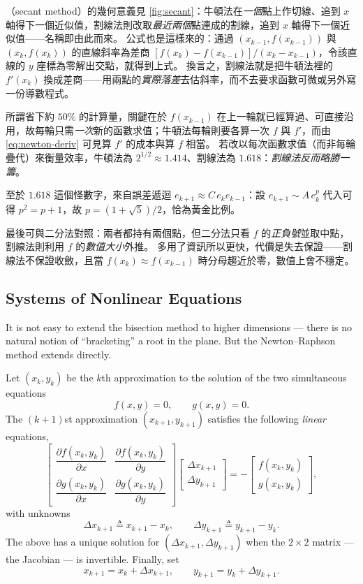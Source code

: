 \begin{remark}
	（secant method）的幾何意義見 \autoref{fig:secant}：牛頓法在\emph{一個}點上作切線、追到 $x$ 軸得下一個近似值，割線法則改取\emph{最近兩個}點連成的割線，追到 $x$ 軸得下一個近似值——名稱即由此而來。
	公式也是這樣來的：通過 $(x_{k-1}, f(x_{k-1}))$ 與 $(x_{k}, f(x_{k}))$ 的直線斜率為差商 $[f(x_{k})-f(x_{k-1})]/(x_{k}-x_{k-1})$，令該直線的 $y$ 座標為零解出交點，就得到上式。
	換言之，割線法就是把牛頓法裡的 $f'(x_{k})$ 換成差商——用兩點的\emph{實際落差}去估斜率，而不去要求函數可微或另外寫一份導數程式。

	所謂省下約 $50\%$ 的計算量，關鍵在於 $f(x_{k-1})$ 在上一輪就已經算過、可直接沿用，故每輪只需\emph{一次}新的函數求值；牛頓法每輪則要各算一次 $f$ 與 $f'$，而由 \eqref{eq:newton-deriv} 可見算 $f'$ 的成本與算 $f$ 相當。
	若改以每次函數求值（而非每輪疊代）來衡量效率，牛頓法為 $2^{1/2} \approx 1.414$、割線法為 $1.618$：\emph{割線法反而略勝一籌}。

	至於 $1.618$ 這個怪數字，來自誤差遞迴 $e_{k+1} \approx C\,e_{k}e_{k-1}$：設 $e_{k+1} \sim A\,e_{k}^{p}$ 代入可得 $p^{2} = p+1$，故 $p = (1+\sqrt{5})/2$，恰為黃金比例。

	最後可與二分法對照：兩者都持有兩個點，但二分法只看 $f$ 的\emph{正負號}並取中點，割線法則利用 $f$ 的\emph{數值大小}外推。
	多用了資訊所以更快，代價是失去保證——割線法不保證收斂，且當 $f(x_{k}) \approx f(x_{k-1})$ 時分母趨近於零，數值上會不穩定。
\end{remark}
\suppend

\subsection{Systems of Nonlinear Equations}

It is not easy to extend the bisection method to higher dimensions --- there is no natural notion of ``bracketing'' a root in the plane.
But the Newton--Raphson method extends directly.

Let $(x_{k}, y_{k})$ be the $k$th approximation to the solution of the two simultaneous equations
\[
	f(x,y) = 0, \qquad g(x,y) = 0 .
\]
The $(k+1)$st approximation $(x_{k+1}, y_{k+1})$ satisfies the following \emph{linear} equations,
\[
	\begin{bmatrix}
		\dfrac{\partial f(x_{k},y_{k})}{\partial x} &
		\dfrac{\partial f(x_{k},y_{k})}{\partial y}   \\[2ex]
		\dfrac{\partial g(x_{k},y_{k})}{\partial x} &
		\dfrac{\partial g(x_{k},y_{k})}{\partial y}
	\end{bmatrix}
	\begin{bmatrix}
		\Delta x_{k+1} \\[2ex] \Delta y_{k+1}
	\end{bmatrix}
	= -
	\begin{bmatrix}
		f(x_{k},y_{k}) \\[2ex] g(x_{k},y_{k})
	\end{bmatrix} ,
\]
with unknowns
\[
	\Delta x_{k+1} \triangleq x_{k+1}-x_{k},
	\qquad
	\Delta y_{k+1} \triangleq y_{k+1}-y_{k} .
\]
The above has a unique solution for $(\Delta x_{k+1}, \Delta y_{k+1})$ when the $2\times 2$ matrix --- the Jacobian --- is invertible.
Finally, set
\[
	x_{k+1} = x_{k} + \Delta x_{k+1},
	\qquad
	y_{k+1} = y_{k} + \Delta y_{k+1} .
\]

